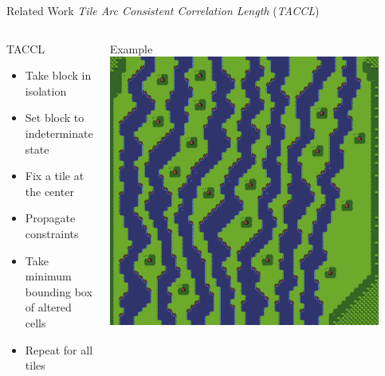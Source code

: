 \documentclass{beamer}
\begin{document}
  \begin{frame}[fragile]{Related Work}
    \textit{Tile Arc Consistent Correlation Length} (\textit{TACCL})
    \begin{columns}[T,onlytextwidth]
        \begin{block}{TACCL}
          \hfill \\
          \begin{itemize}
            \item Take block in isolation
            \item Set block to indeterminate state
            \item Fix a tile at the center
            \item Propagate constraints
            \item Take minimum bounding box of altered cells
            \item Repeat for all tiles
          \end{itemize}
        \end{block}
        \begin{block}{Example}
          \includegraphics[width=0.9\textwidth]{img/forestmicro_64x64.pdf}
        \end{block}
    \end{columns}
  \end{frame}
\end{document}
